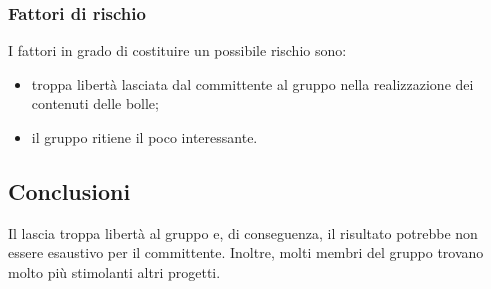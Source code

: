 		\subsubsection {Fattori di rischio}
		I fattori in grado di costituire un possibile rischio sono:
			\begin{itemize}
				\item troppa libertà lasciata dal committente al gruppo nella realizzazione dei contenuti delle bolle;		
				\item il gruppo ritiene il  poco interessante.
			\end{itemize}
	\subsection {Conclusioni}
		Il  lascia troppa libertà al gruppo e, di conseguenza, il risultato potrebbe non essere esaustivo per il committente. Inoltre, molti membri del gruppo trovano molto più stimolanti altri progetti.
	
